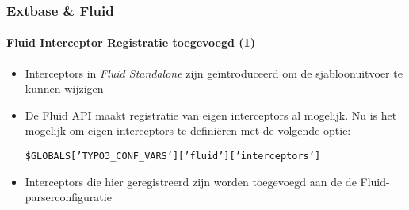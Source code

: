 \begin{frame}[fragile]
	\frametitle{Extbase \& Fluid}
	\framesubtitle{Fluid Interceptor Registratie toegevoegd (1)}

	\lstset{basicstyle=\tiny\ttfamily}

	\begin{itemize}

		\item Interceptors in \textit{Fluid Standalone} zijn geïntroduceerd om de sjabloonuitvoer te kunnen wijzigen

		\item De Fluid API maakt registratie van eigen interceptors al mogelijk.
			Nu is het mogelijk om eigen interceptors te definiëren met de volgende optie:

			\small
				\texttt{\$GLOBALS['TYPO3\_CONF\_VARS']['fluid']['interceptors']}
			\normalsize

		\item Interceptors die hier geregistreerd zijn worden toegevoegd aan de de Fluid-parserconfiguratie

	\end{itemize}

\end{frame}

